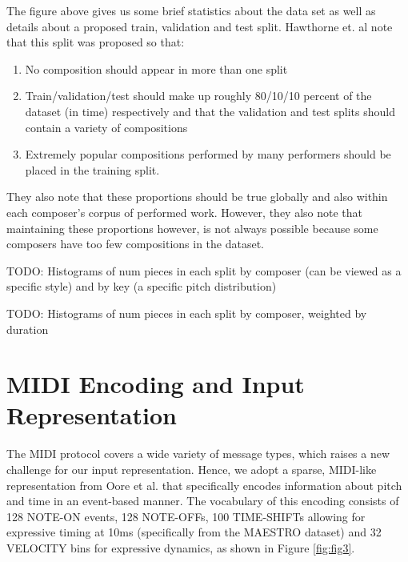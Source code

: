 \documentclass[../main.tex]{subfiles}
\begin{document}
The figure above gives us some brief statistics about the data set as well as details about a proposed train, validation and test split. Hawthorne et. al note that this split was proposed so that: 

\begin{enumerate}
    \item No composition should appear in more than one split
    \item Train/validation/test should make up roughly 80/10/10 percent of the dataset (in time) respectively and that the validation and test splits should contain a variety of compositions
    \item Extremely popular compositions performed by many performers should be placed in the training split.
\end{enumerate} 

They also note that these proportions should be true globally and also within each composer's corpus of performed work. However, they also note that maintaining these proportions however, is not always possible because some composers have too
few compositions in the dataset.

TODO: Histograms of num pieces in each split by composer (can be viewed as a specific style) and by key (a specific pitch distribution)

TODO: Histograms of num pieces in each split by composer, weighted by duration

\section{MIDI Encoding and Input Representation}

The MIDI protocol covers a wide variety of message types, which raises a new challenge for our input representation. Hence, we adopt a sparse, MIDI-like representation from Oore et al. \cite {oore:1} that specifically encodes information about pitch and time in an event-based manner. The vocabulary of this encoding consists of 128 NOTE-ON events, 128 NOTE-OFFs, 100 TIME-SHIFTs allowing for expressive timing at 10ms (specifically from the MAESTRO dataset) and 32 VELOCITY bins for expressive dynamics, as shown in Figure \ref{fig:fig3}. 
\end{document}
